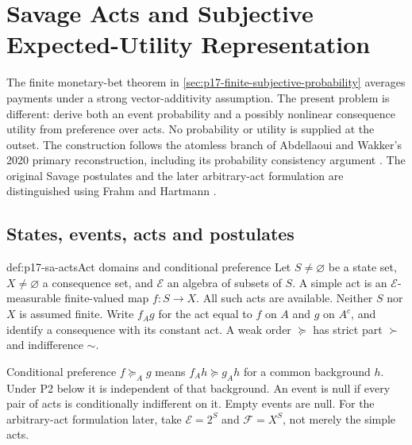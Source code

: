 \chapter{Savage Acts and Subjective Expected-Utility Representation}
\label{sec:p17-savage-acts}

The finite monetary-bet theorem in
\cref{sec:p17-finite-subjective-probability} averages payments
under a strong vector-additivity assumption. The present problem
is different: derive both an event probability and a possibly
nonlinear consequence utility from preference over acts.
No probability or utility is supplied at the outset.
The construction follows the atomless branch of Abdellaoui and
Wakker's 2020 primary reconstruction, including its probability
consistency argument \cite{AbdellaouiWakker2020SavageSA}.
The original Savage postulates and the later arbitrary-act
formulation are distinguished using Frahm and Hartmann
\cite{FrahmHartmann2025SavageSA}.

\section{States, events, acts and postulates}
\label{sec:p17-sa-domain}

\begin{hbdefinition}{def:p17-sa-acts}{Act domains and conditional preference}
Let \(S\ne\varnothing\) be a state set, \(X\ne\varnothing\)
a consequence set, and \(\mathcal E\) an algebra of subsets
of \(S\). A simple act is an \(\mathcal E\)-measurable
finite-valued map \(f:S\to X\). All such acts are available.
Neither \(S\) nor \(X\) is assumed finite.
Write \(f_Ag\) for the act equal to \(f\) on \(A\) and
\(g\) on \(A^c\), and identify a consequence with its constant
act. A weak order \(\succeq\) has strict part \(\succ\)
and indifference \(\sim\).

Conditional preference \(f\succeq_Ag\) means
\(f_Ah\succeq g_Ah\) for a common background \(h\).
Under P2 below it is independent of that background.
An event is null if every pair of acts is conditionally
indifferent on it. Empty events are null.
For the arbitrary-act formulation later, take
\(\mathcal E=2^S\) and \(\mathcal F=X^S\), not merely
the simple acts.
\end{hbdefinition}

